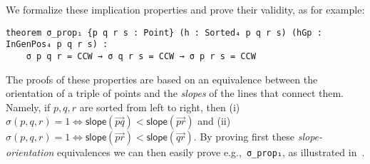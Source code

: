 We formalize these implication properties and prove their validity, as for example: 
\begin{lstlisting}
theorem σ_prop₁ {p q r s : Point} (h : Sorted₄ p q r s) (hGp : InGenPos₄ p q r s) :
    σ p q r = CCW → σ q r s = CCW → σ p r s = CCW 
\end{lstlisting}


The proofs of these properties are based on an equivalence between the orientation of a triple of points and the \emph{slopes} of the lines that connect them. Namely, if $p, q, r$  are sorted from left to right, then (i) $\sigma(p,q,r)=1 \iff \textsf{slope}(\vec{pq}) < \textsf{slope}(\vec{pr})$  and (ii) $\sigma(p,q,r)=1 \iff \textsf{slope}(\vec{pr}) < \textsf{slope}(\vec{qr})$. By proving first these \emph{slope-orientation} equivalences we can then easily prove e.g.,~\lstinline|σ_prop₁|, as illustrated in~. 

